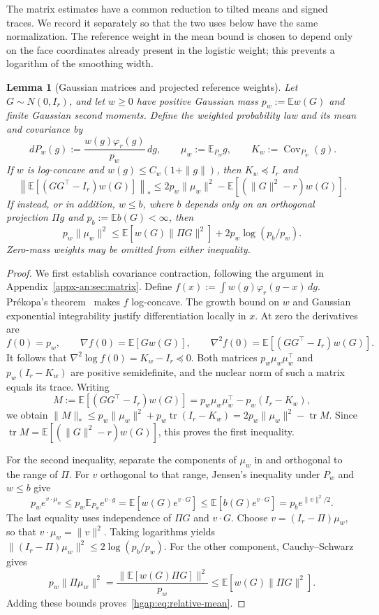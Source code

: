\documentclass[11pt,letterpaper]{article}
\newtheorem{lemma}{Lemma}
\theoremstyle{remark}
\newcommand{\E}{\mathbb E}
\newcommand{\Cov}{\operatorname{Cov}}
\newcommand{\tr}{\operatorname{tr}}
\newcommand{\dd}{\,d}
\begin{document}
The matrix estimates have a common reduction to tilted means and
signed traces. We record it separately so that the two uses below
have the same normalization. The reference weight in the mean bound
is chosen to depend only on the face coordinates already present in
the logistic weight; this prevents a logarithm of the smoothing width.

\begin{lemma}[Gaussian matrices and projected reference weights]
\label{hgap:lem:gaussian}
Let $G\sim N(0,I_r)$, and let $w\ge0$ have positive Gaussian mass
$p_w:=\E w(G)$ and finite Gaussian second moments. Define the weighted
probability law and its mean and covariance by
\[
 \dd P_w(g):=\frac{w(g)\varphi_r(g)}{p_w}\dd g,
 \qquad \mu_w:=\E_{P_w}g,\qquad K_w:=\Cov_{P_w}(g).
\]
If $w$ is log-concave and $w(g)\le C_w(1+\|g\|)$, then
$K_w\preceq I_r$ and
\begin{equation}\label{hgap:eq:matrix-reduction}
 \left\|\E[(GG^\top-I_r)w(G)]\right\|_*
 \le 2p_w\|\mu_w\|^2-\E[(\|G\|^2-r)w(G)].
\end{equation}
If instead, or in addition, $w\le b$, where $b$ depends only on an
orthogonal projection $\Pi g$ and $p_b:=\E b(G)<\infty$, then
\begin{equation}\label{hgap:eq:relative-mean}
 p_w\|\mu_w\|^2
 \le\E[w(G)\|\Pi G\|^2]+2p_w\log(p_b/p_w).
\end{equation}
Zero-mass weights may be omitted from either inequality.
\end{lemma}

\begin{proof}
We first establish covariance contraction, following the argument in
Appendix~\ref{appx-an:sec:matrix}. Define
$f(x):=\int w(g)\varphi_r(g-x)\dd g$.
Pr\'ekopa's theorem~\cite{Prekopa1973} makes $f$ log-concave.
The growth bound on $w$ and Gaussian exponential integrability justify
differentiation locally in $x$. At zero the derivatives are
\[
 f(0)=p_w,\qquad \nabla f(0)=\E[Gw(G)],\qquad
 \nabla^2 f(0)=\E[(GG^\top-I_r)w(G)].
\]
It follows that $\nabla^2\log f(0)=K_w-I_r\preceq0$.
Both matrices $p_w\mu_w\mu_w^\top$ and $p_w(I_r-K_w)$ are positive
semidefinite, and the nuclear norm of such a matrix equals its trace.
Writing
\[
 M:=\E[(GG^\top-I_r)w(G)]
       =p_w\mu_w\mu_w^\top-p_w(I_r-K_w),
\]
we obtain
$\|M\|_*\le p_w\|\mu_w\|^2+p_w\tr(I_r-K_w)
=2p_w\|\mu_w\|^2-\tr M$.
Since $\tr M=\E[(\|G\|^2-r)w(G)]$, this proves the first inequality.

For the second inequality, separate the components of $\mu_w$ in
and orthogonal to the range of $\Pi$. For $v$ orthogonal to that range,
Jensen's inequality under $P_w$ and $w\le b$ give
\[
 p_we^{v\cdot\mu_w}
 \le p_w\E_{P_w}e^{v\cdot g}
 =\E[w(G)e^{v\cdot G}]
 \le\E[b(G)e^{v\cdot G}]
 =p_be^{\|v\|^2/2}.
\]
The last equality uses independence of $\Pi G$ and $v\cdot G$.
Choose $v=(I_r-\Pi)\mu_w$, so that $v\cdot\mu_w=\|v\|^2$.
Taking logarithms yields
$\|(I_r-\Pi)\mu_w\|^2\le2\log(p_b/p_w)$.
For the other component, Cauchy--Schwarz gives
\[
 p_w\|\Pi\mu_w\|^2
 =\frac{\|\E[w(G)\Pi G]\|^2}{p_w}
 \le\E[w(G)\|\Pi G\|^2].
\]
Adding these bounds proves~\eqref{hgap:eq:relative-mean}.
\end{proof}
\end{document}
